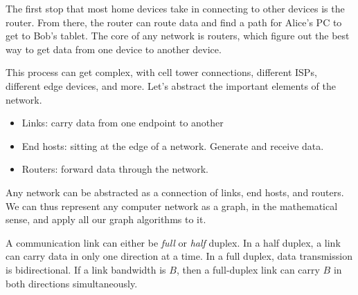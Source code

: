 The first stop that most home devices take in connecting to other
devices is the router. From there, the router can route data and
find a path for Alice's PC to get to Bob's tablet. The core of any
network is routers, which figure out the best way to get data from
one device to another device.

This process can get complex, with cell tower connections, different ISPs,
different edge devices, and more. Let's abstract the important elements
of the network.

\begin{itemize}
    \item Links: carry data from one endpoint to another
    \item End hosts: sitting at the edge of a network. Generate and receive data.
    \item Routers: forward data through the network.
\end{itemize}

Any network can be abstracted as a connection of links, end hosts, and routers.
We can thus represent any computer network as a graph, in the mathematical
sense, and apply all our graph algorithms to it.

A communication link can either be \emph{full} or \emph{half} duplex.
In a half duplex, a link can carry data in only one direction at a time.
In a full duplex, data transmission is bidirectional.
If a link bandwidth is $B$, then a full-duplex link can carry $B$
in both directions simultaneously.